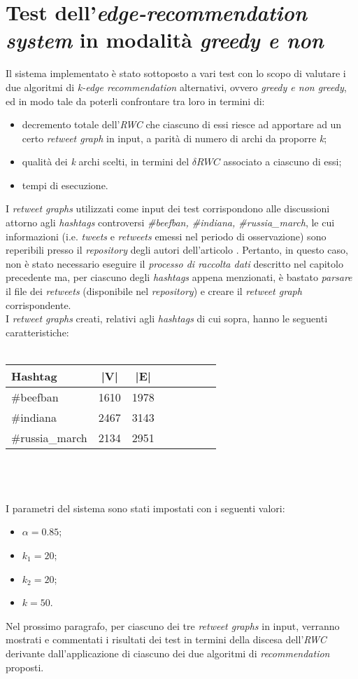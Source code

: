 \chapter{Test dell’\textit{edge-recommendation system} in modalità \textit{greedy e non}}
\label{chap:test}

Il sistema implementato è stato sottoposto a vari test con lo scopo di valutare i due algoritmi di \textit{k-edge recommendation} alternativi, ovvero \textit{greedy e non greedy}, ed in modo tale da poterli confrontare tra loro in termini di:
\begin{itemize} 
\item decremento totale dell'\textit{RWC} che ciascuno di essi riesce ad apportare ad un certo \textit{retweet graph} in input, a parità di numero di archi da proporre \textit{k};
\item qualità dei \textit{k} archi scelti, in termini del \textit{$\delta RWC$} associato a ciascuno di essi;
\item tempi di esecuzione.
\end{itemize}

I \textit{retweet graphs} utilizzati come input dei test corrispondono alle discussioni attorno agli \textit{hashtags} controversi \textit{\#beefban, \#indiana, \#russia\_march}, le cui informazioni (i.e. \textit{tweets} e \textit{retweets} emessi nel periodo di osservazione) sono reperibili presso il \textit{repository} degli autori dell'articolo \cite{garimella:paper}. Pertanto, in questo caso, non è stato necessario eseguire il \textit{processo di raccolta dati} descritto nel capitolo precedente ma, per ciascuno degli \textit{hashtags} appena menzionati, è bastato \textit{parsare} il file dei \textit{retweets} (disponibile nel \textit{repository}) e creare il \textit{retweet graph} corrispondente.
\\I \textit{retweet graphs} creati, relativi agli \textit{hashtags} di cui sopra, hanno le seguenti caratteristiche:
\\\\
\begin{tabular}{l*{6}{c}r}
\textbf{Hashtag}         & \textbf{|V|} & \textbf{|E|}  \\
\hline
\#beefban 		 & 1610 & 1978  \\
\#indiana        	 & 2467 & 3143  \\
\#russia\_march   	 & 2134 & 2951  \\
\end{tabular}
\\\\\\
I parametri del sistema sono stati impostati con i seguenti valori:
\begin{itemize}
\item $\alpha = 0.85$;
\item $k_1 = 20$; 
\item $k_2 = 20$;
\item $k = 50$.
\end{itemize}
Nel prossimo paragrafo, per ciascuno dei tre \textit{retweet graphs} in input, verranno mostrati e commentati i risultati dei test in termini della discesa dell'\textit{RWC} derivante dall'applicazione di ciascuno dei due algoritmi di \textit{recommendation} proposti. 

